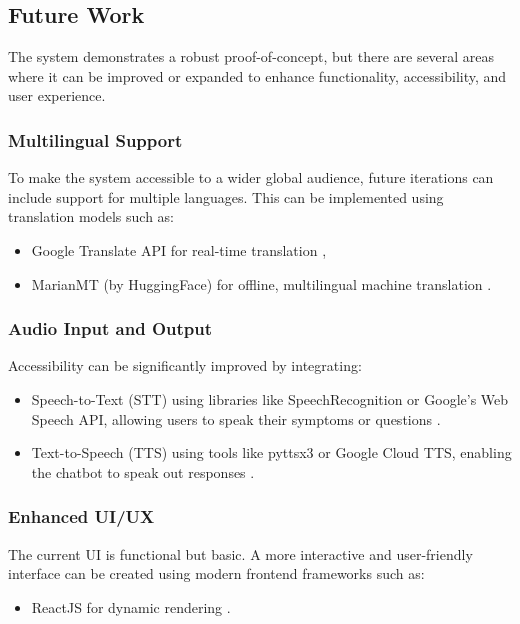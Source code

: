 \documentclass[12pt,a4paper]{report}
\begin{document}
\subsection{Future Work}
\label{Future Work}

The system demonstrates a robust proof-of-concept, but there are several areas where it can be improved or expanded to enhance functionality, accessibility, and user experience.

\subsubsection{Multilingual Support}
\label{Multilingual Support}

To make the system accessible to a wider global audience, future iterations can include support for multiple languages. This can be implemented using translation models such as:
\begin{itemize}
    \item Google Translate API for real-time translation \cite{google_translate},
    \item MarianMT (by HuggingFace) for offline, multilingual machine translation \cite{marianmt}.
\end{itemize}

\subsubsection{Audio Input and Output}
\label{Audio Input and Output}

Accessibility can be significantly improved by integrating:
\begin{itemize}
    \item Speech-to-Text (STT) using libraries like SpeechRecognition or Google's Web Speech API, allowing users to speak their symptoms or questions \cite{speechrecognition}.
    \item Text-to-Speech (TTS) using tools like pyttsx3 or Google Cloud TTS, enabling the chatbot to speak out responses \cite{google_tts}.
\end{itemize}

\subsubsection{Enhanced UI/UX}
\label{Enhanced UI/UX}

The current UI is functional but basic. A more interactive and user-friendly interface can be created using modern frontend frameworks such as:
\begin{itemize}
    \item ReactJS for dynamic rendering \cite{reactjs}.
\end{itemize}
\end{document}
